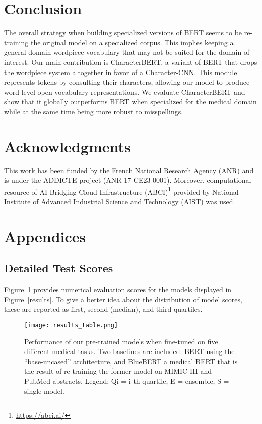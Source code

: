 \documentclass[11pt]{article}
\begin{document}
\section{Conclusion}

The overall strategy when building specialized versions of BERT seems to be re-training the original model on a specialized corpus. This implies keeping a general-domain wordpiece vocabulary that may not be suited for the domain of interest. Our main contribution is CharacterBERT, a variant of BERT that drops the wordpiece system altogether in favor of a Character-CNN. This module represents tokens by consulting their characters, allowing our model to produce word-level open-vocabulary representations. We evaluate CharacterBERT and show that it globally outperforms BERT when specialized for the medical domain while at the same time being more robust to misspellings.

\section*{Acknowledgments}
This  work  has  been  funded  by  the  French  National Research Agency (ANR) and is under the ADDICTE project (ANR-17-CE23-0001). Moreover, computational resource of AI Bridging Cloud Infrastructure (ABCI)\footnote{\url{https://abci.ai/}} provided by National Institute of Advanced Industrial Science and Technology (AIST) was used.




\clearpage

\appendix
\section{Appendices}
\label{sec:appendices}

\subsection{Detailed Test Scores}
Figure~\ref{results_table} provides numerical evaluation scores for the models displayed in Figure~\ref{results}. To give a better idea about the distribution of model scores, these are reported as first, second (median), and third quartiles.

\begin{figure}[htbp]
\begin{center} 
\texttt{[image: results\_table.png]}
\end{center} 
\caption{Performance of our pre-trained models when fine-tuned on five different medical tasks. Two baselines are included: BERT \protect\cite{devlin-etal-2019-bert} using the ``base-uncased'' architecture, and BlueBERT \protect\cite{peng2019transfer} a medical BERT that is the result of re-training the former model on MIMIC-III and PubMed abstracts. Legend: Qi = i-th quartile, E = ensemble, S = single model.} \label{results_table}
\end{figure}
\end{document}
